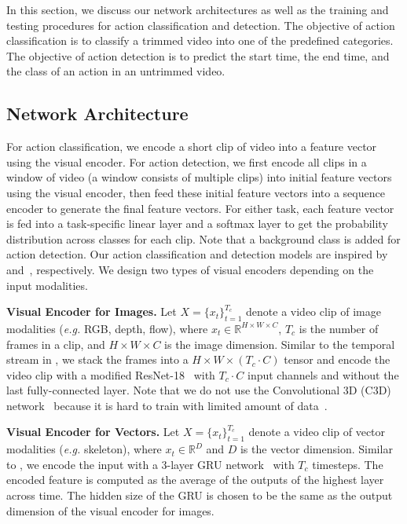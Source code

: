 In this section, we discuss our network architectures as well as the training and testing procedures for action classification and detection. The objective of action classification is to classify a trimmed video into one of the predefined categories. The objective of action detection is to predict the start time, the end time, and the class of an action in an untrimmed video.

\subsection{Network Architecture}\label{sec:network_architecture}
For action classification, we encode a short clip of video into a feature vector using the visual encoder. For action detection, we first encode all clips in a window of video (a window consists of multiple clips) into initial feature vectors using the visual encoder, then feed these initial feature vectors into a sequence encoder to generate the final feature vectors. For either task, each feature vector is fed into a task-specific linear layer and a softmax layer to get the probability distribution across classes for each clip. Note that a background class is added for action detection. Our action classification and detection models are inspired by~\cite{two_stream_simonyan} and~\cite{montes2016temporal}, respectively. We design two types of visual encoders depending on the input modalities.

\noindent\textbf{Visual Encoder for Images.} Let $X=\{x_t\}_{t=1}^{T_c}$ denote a video clip of image modalities (\textit{e.g.} RGB, depth, flow), where $x_t\in\mathbb{R}^{H\times W\times C}$, $T_c$ is the number of frames in a clip, and $H\times W\times C$ is the image dimension. Similar to the temporal stream in \cite{two_stream_simonyan}, we stack the frames into a $H\times W\times (T_c\cdot C)$ tensor and encode the video clip with a modified ResNet-18~\cite{resnet} with $T_c\cdot C$ input channels and without the last fully-connected layer. Note that we do not use the Convolutional 3D (C3D) network~\cite{i3d_carreira,c3d_tran} because it is hard to train with limited amount of data~\cite{i3d_carreira}.

\noindent\textbf{Visual Encoder for Vectors.} Let $X=\{x_t\}_{t=1}^{T_c}$ denote a video clip of vector modalities (\textit{e.g.} skeleton), where $x_t\in\mathbb{R}^{D}$ and $D$ is the vector dimension. Similar to \cite{10-stream}, we encode the input with a 3-layer GRU network~\cite{gru} with $T_c$ timesteps. The encoded feature is computed as the average of the outputs of the highest layer across time. The hidden size of the GRU is chosen to be the same as the output dimension of the visual encoder for images.

